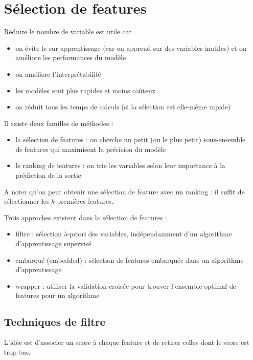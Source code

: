 \chapter{Sélection de features}

Réduire le nombre de variable est utile car

\begin{itemize}
	\item on évite le sur-apprentissage (car on apprend sur des variables inutiles) et on améliore les performances du modèle
	\item on améliore l'interprétabilité
	\item les modèles sont plus rapides et moins coûteux
	\item on réduit tous les temps de calculs (si la sélection est elle-même rapide)
\end{itemize}

Il existe deux familles de méthodes :

\begin{itemize}
	\item la sélection de features : on cherche un petit (ou le plus petit) sous-ensemble de features qui maximisent la précision du modèle
	\item le ranking de features : on trie les variables selon leur importance à la prédiction de la sortie
\end{itemize}

A noter qu'on peut obtenir une sélection de feature avec un ranking : il suffit de sélectionner les $k$ premières features.

Trois approches existent dans la sélection de features :

\begin{itemize}
	\item filtre : sélection à-priori des variables, indépendamment d'un algorithme d'apprentissage supervisé
	\item embarqué (embedded) : sélection de features embarquée dans un algorithme d'apprentissage
	\item wrapper : utiliser la validation croisée pour trouver l'ensemble optimal de features pour un algorithme
\end{itemize}

\section{Techniques de filtre}

	L'idée est d'associer un score à chaque feature et de retirer celles dont le score est trop bas.
	
